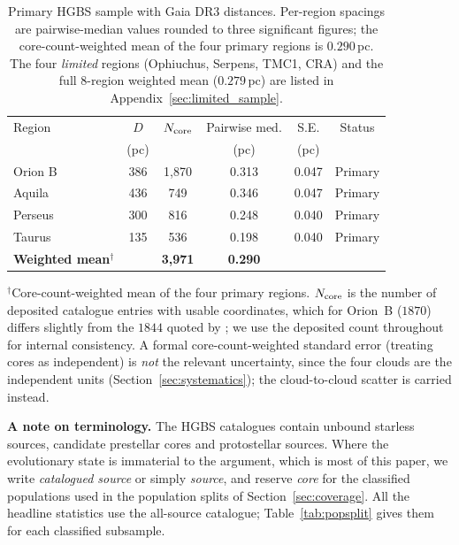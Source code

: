 \documentclass[usenatbib,twoside,twocolumn]{mnras}
\begin{document}
\begin{table}
\caption{Primary HGBS sample with Gaia DR3 distances. Per-region spacings are pairwise-median values rounded to three significant figures; the core-count-weighted mean of the four primary regions is $0.290$\,pc. The four \emph{limited} regions (Ophiuchus, Serpens, TMC1, CRA) and the full 8-region weighted mean ($0.279$\,pc) are listed in Appendix~\ref{sec:limited_sample}.}
\label{tab:sample}
\footnotesize
\setlength{\tabcolsep}{3pt}
\begin{tabular}{lccccc}
\toprule
Region & $D$ & $N_{\rm core}$ & Pairwise med. & S.E. & Status \\
       & (pc) &  & (pc) & (pc) &  \\
\midrule
Orion B  & 386 & 1,870 & 0.313 & 0.047 & Primary \\
Aquila   & 436 & 749   & 0.346 & 0.047 & Primary \\
Perseus  & 300 & 816   & 0.248 & 0.040 & Primary \\
Taurus   & 135 & 536   & 0.198 & 0.040 & Primary \\
\midrule
\textbf{Weighted mean}$^\dagger$ &  & \textbf{3,971} & \textbf{0.290} & &  \\
\bottomrule
\end{tabular}
\par\vspace{2pt}
\footnotesize $^\dagger$Core-count-weighted mean of the four primary regions. $N_{\rm core}$ is the number of deposited catalogue entries with usable coordinates, which for Orion~B ($1870$) differs slightly from the $1844$ quoted by \citet{Konyves2020}; we use the deposited count throughout for internal consistency. A formal core-count-weighted standard error (treating cores as independent) is \emph{not} the relevant uncertainty, since the four clouds are the independent units (Section~\ref{sec:systematics}); the cloud-to-cloud scatter is carried instead.
\end{table}

\smallskip\noindent\textbf{A note on terminology.} The HGBS catalogues contain unbound starless sources, candidate prestellar cores and protostellar sources. Where the evolutionary state is immaterial to the argument, which is most of this paper, we write \emph{catalogued source} or simply \emph{source}, and reserve \emph{core} for the classified populations used in the population splits of Section~\ref{sec:coverage}. All the headline statistics use the all-source catalogue; Table~\ref{tab:popsplit} gives them for each classified subsample.
\end{document}
